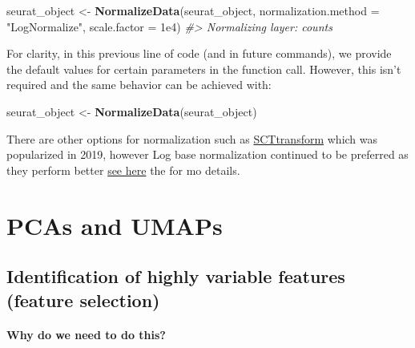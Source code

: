 \documentclass[
]{book}
\newenvironment{Shaded}{\begin{snugshade}}{\end{snugshade}}
\newcommand{\AttributeTok}[1]{\textcolor[rgb]{0.13,0.29,0.53}{#1}}
\newcommand{\CommentTok}[1]{\textcolor[rgb]{0.56,0.35,0.01}{\textit{#1}}}
\newcommand{\FloatTok}[1]{\textcolor[rgb]{0.00,0.00,0.81}{#1}}
\newcommand{\FunctionTok}[1]{\textcolor[rgb]{0.13,0.29,0.53}{\textbf{#1}}}
\newcommand{\NormalTok}[1]{#1}
\newcommand{\OtherTok}[1]{\textcolor[rgb]{0.56,0.35,0.01}{#1}}
\newcommand{\StringTok}[1]{\textcolor[rgb]{0.31,0.60,0.02}{#1}}
\begin{document}
\begin{Shaded}
\begin{Highlighting}[]
\NormalTok{seurat\_object }\OtherTok{\textless{}{-}} \FunctionTok{NormalizeData}\NormalTok{(seurat\_object, }\AttributeTok{normalization.method =} \StringTok{"LogNormalize"}\NormalTok{, }\AttributeTok{scale.factor =} \FloatTok{1e4}\NormalTok{)}
\CommentTok{\#\textgreater{} Normalizing layer: counts}
\end{Highlighting}
\end{Shaded}

For clarity, in this previous line of code (and in future commands), we provide the default values for certain parameters in the function call. However, this isn't required and the same behavior can be achieved with:

\begin{Shaded}
\begin{Highlighting}[]
\NormalTok{seurat\_object }\OtherTok{\textless{}{-}} \FunctionTok{NormalizeData}\NormalTok{(seurat\_object)}
\end{Highlighting}
\end{Shaded}

There are other options for normalization such as \href{https://genomebiology.biomedcentral.com/articles/10.1186/s13059-019-1874-1}{SCTtransform} which was popularized in 2019, however Log base normalization continued to be preferred as they perform better \href{https://www.nature.com/articles/s41592-023-01814-1}{see here} the for mo details.

\hypertarget{reducedims}{%
\chapter{PCAs and UMAPs}\label{reducedims}}

\hypertarget{identification-of-highly-variable-features-feature-selection}{%
\section{Identification of highly variable features (feature selection)}\label{identification-of-highly-variable-features-feature-selection}}

\hypertarget{why-do-we-need-to-do-this-2}{%
\subsubsection*{Why do we need to do this?}\label{why-do-we-need-to-do-this-2}}
\end{document}
